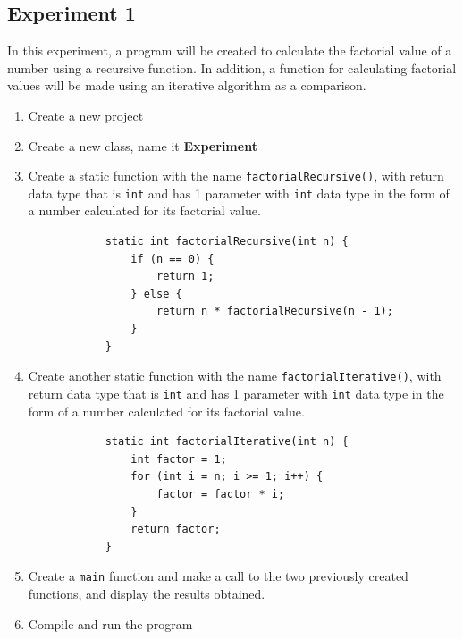 \documentclass[12pt,titlepage]{article}
\begin{document}
\subsection{Experiment 1}
In this experiment, a program will be created to calculate the factorial value of a number using a recursive function.
In addition, a function for calculating factorial values will be made using an iterative algorithm as a comparison.
\begin{enumerate}
    \item Create a new project
    \item Create a new class, name it \textbf{Experiment}
    \item {
        Create a static function with the name \texttt{factorialRecursive()}, 
        with return data type that is \texttt{int} and has 1 parameter with \texttt{int} data type in the form of a number calculated for its factorial value.

        \begin{verbatim}
            static int factorialRecursive(int n) {
                if (n == 0) {
                    return 1;
                } else {
                    return n * factorialRecursive(n - 1);
                }
            }
        \end{verbatim}
    }
    \item {
        Create another static function with the name \texttt{factorialIterative()}, with return data type
        that is \texttt{int} and has 1 parameter with \texttt{int} data type in the form of a number calculated for its factorial value.

        \begin{verbatim}
            static int factorialIterative(int n) {
                int factor = 1;
                for (int i = n; i >= 1; i++) {
                    factor = factor * i;
                }
                return factor;
            }
        \end{verbatim}
    }
    \item {
        Create a \texttt{main} function and make a call to the two previously created functions, 
        and display the results obtained.
    }
    \pagebreak
    \item {
        Compile and run the program

}
\end{enumerate}
\end{document}
